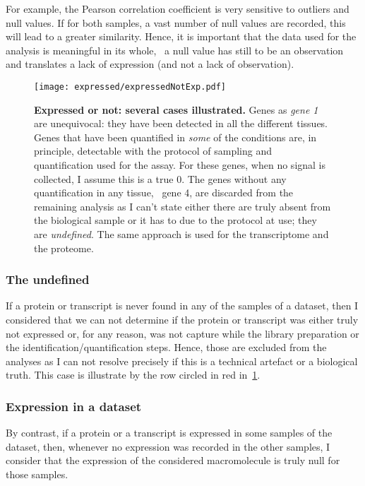 For example, the Pearson correlation coefficient is very
sensitive to outliers and null values. If for both samples, a vast number of
null values are recorded, this will lead to a greater similarity.
Hence, it is important that the data used for the analysis is meaningful in
its whole, \ie\ a null value has still to be an observation and translates
a lack of expression (and not a lack of observation).

\begin{figure}[!htbp]
    \texttt{[image: expressed/expressedNotExp.pdf]}\centering
      \caption[Expressed or not: several cases illustrated]
      {\label{fig:DefineExpression}\textbf{Expressed or not: several cases
      illustrated.}\smallbreak{} Genes as \emph{gene 1} are unequivocal: they have been
      detected in all the different tissues. Genes that have been quantified in
      \emph{some} of the conditions are, in principle, detectable with the
      protocol of sampling and quantification used for the assay.
      For these genes, when no signal is collected, I assume this is a true $0$.
      The genes without any quantification
      in any tissue, \eg\ gene 4, are discarded from the remaining analysis as
      I can't state
      either there are truly absent from the biological sample or it has to due
      to the protocol at use; they are \emph{undefined}. The same approach is used
      for the transcriptome and the proteome.}
\end{figure}

\subsubsection{The undefined}%
\label{subsec:ExpressedOrNot-undefined}
If a protein or transcript is never found in any of the samples of a dataset,
then I considered that we can not determine if the protein or transcript was
either truly not expressed or, for any reason, was not capture while the library
preparation or the identification/quantification steps. Hence, those are
excluded from the analyses as I can not resolve precisely if this is a
technical artefact or a biological truth. This case is illustrate by the row
circled in red in~\cref{fig:DefineExpression}.

\subsubsection{Expression in a dataset}
\label{subsec:ExpressedOrNot--expDataset}
By contrast, if a protein or a transcript is expressed in some samples of the
dataset, then, whenever no expression was recorded in the other
samples, I consider that the expression of the considered macromolecule is truly
null for those samples.

